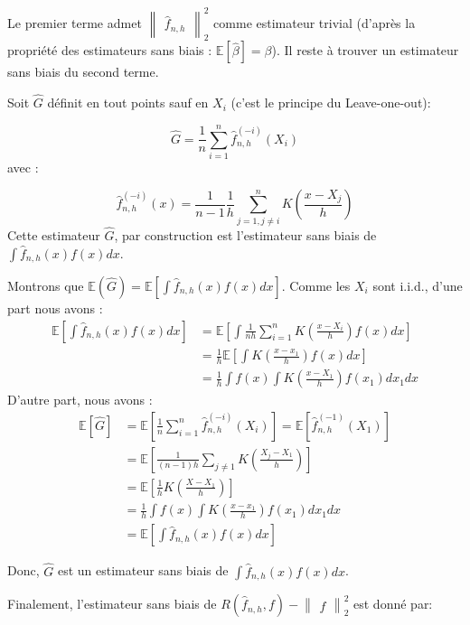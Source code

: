 \documentclass[
]{book}
\begin{document}
Le premier terme admet \(\begin{Vmatrix}\hat {f}_{n,h}\end{Vmatrix}_2^2\) comme estimateur trivial (d'après la propriété des estimateurs sans biais : \(\mathbb{E}[\hat {\beta}]=\beta\)).\newline
Il reste à trouver un estimateur sans biais du second terme.

\begin{lem} Soit $\hat {G}$ définit en tout points sauf en $X_i$ (c'est le principe du Leave-one-out):

$$
\hat{G} = \frac{1}{n}\sum_{i=1}^n\hat {f}_{n,h}^{(-i)}(X_i)
$$
avec :

$$
  \hat {f}_{n,h}^{(-i)}(x)= \frac{1}{n-1}\frac{1}{h}\sum_{j=1,j\ne i}^nK(\frac{x-X_j}{h})
$$
Cette estimateur $\hat G$, par construction est l'estimateur sans biais de $\int \hat{f}_{n,h}(x)f(x)dx$.
\end{lem}
\begin{demo}
Montrons que $\mathbb{E}(\hat{G})=\mathbb{E}[\int \hat{f}_{n,h}(x)f(x)dx]$.\newline
Comme les $X_i$ sont i.i.d., d'une part nous avons :
$$
\begin{aligned}
\mathbb{E}[\int \hat {f}_{n,h}(x)f(x)dx]&= \mathbb{E}[\int \frac {1}{nh}\sum_{i=1}^nK(\frac {x-X_i}{h})f(x)dx]\\
&=\frac{1}{h}\mathbb{E}[\int K(\frac {x-x_1}{h})f(x)dx] \\
&=\frac{1}{h}\int f(x)\int K(\frac {x-X_1}{h})f(x_1)dx_1dx
\end{aligned}
$$
D'autre part, nous avons : 
$$ 
\begin{aligned}
\mathbb{E}[\hat{G}]&=\mathbb{E}[\frac{1}{n}\sum_{i=1}^n\hat{f}_{n,h}^{(-i)}(X_i)]
=\mathbb{E}[\hat{f}_{n,h}^{(-1)}(X_1)]\\
&=\mathbb{E}[\frac{1}{(n-1)h}\sum_{j\ne 1}K(\frac{X_j-X_1}{h})]\\
&=\mathbb{E}[\frac{1}{h}K(\frac{X-X_1}{h})]\\
&=\frac{1}{h}\int f(x)\int K(\frac{x-x_1}{h})f(x_1)dx_1dx\\
&=\mathbb{E}[\int \hat{f}_{n,h}(x)f(x)dx] 
\end{aligned}
$$

Donc, $\hat{G}$ est un estimateur sans biais de $\int\hat{f}_{n,h}(x)f(x)dx$.
\end{demo}

Finalement, l'estimateur sans biais de \(R(\hat{f}_{n,h}, f)-\begin{Vmatrix}{f}\end{Vmatrix}_2^2\) est donné par:
\end{document}
